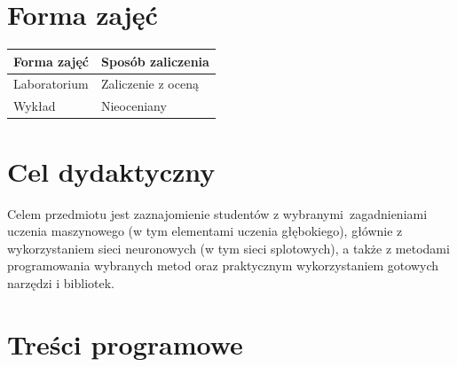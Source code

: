 \documentclass[12pt, a4paper]{article}
\begin{document}
\section{Forma zajęć}

\begin{tabular}{ll}
  \hline
  \textbf{Forma zajęć} & \textbf{Sposób zaliczenia} \\
  \hline
  Laboratorium & Zaliczenie z oceną \\
  Wykład & Nieoceniany \\
  \hline
\end{tabular}

\section{Cel dydaktyczny}

Celem przedmiotu jest zaznajomienie studentów z wybranymi zagadnieniami uczenia maszynowego (w tym elementami uczenia głębokiego), głównie z wykorzystaniem sieci neuronowych (w tym sieci splotowych), a także z metodami programowania wybranych metod oraz praktycznym wykorzystaniem gotowych narzędzi i bibliotek.

\section{Treści programowe}
\end{document}
